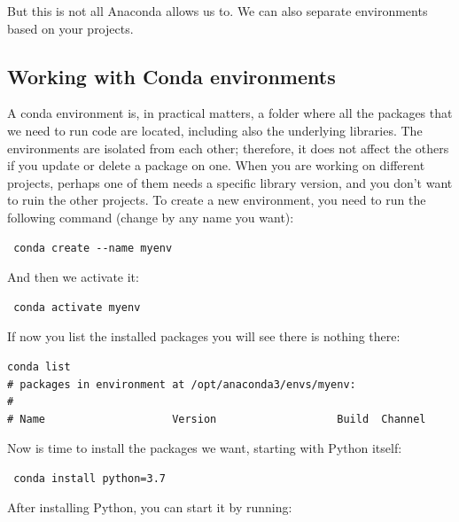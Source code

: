 But this is not all Anaconda allows us to. We can also separate environments based on your projects.

\subsection{Working with Conda environments}\label{subsec:conda-environments}
A conda environment is, in practical matters, a folder where all the packages that we need to run code are located, including also the underlying libraries. The environments are isolated from each other; therefore, it does not affect the others if you update or delete a package on one. When you are working on different projects, perhaps one of them needs a specific library version, and you don't want to ruin the other projects. To create a new environment, you need to run the following command (change  by any name you want):

\begin{verbatim}
 conda create --name myenv
\end{verbatim}

And then we activate it:

\begin{verbatim}
 conda activate myenv
\end{verbatim}

If now you list the installed packages you will see there is nothing there:

\begin{verbatim}
conda list
# packages in environment at /opt/anaconda3/envs/myenv:
#
# Name                    Version                   Build  Channel
\end{verbatim}

Now is time to install the packages we want, starting with Python itself:

\begin{verbatim}
 conda install python=3.7
\end{verbatim}


After installing Python, you can start it by running:

